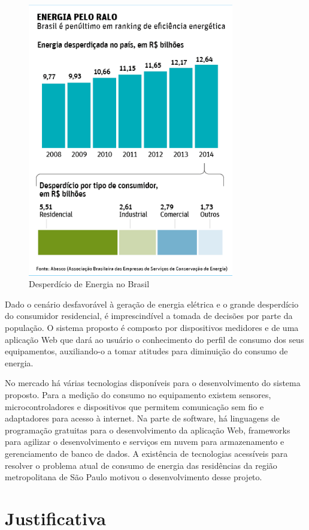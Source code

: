 \begin{figure}[H]
\centering
\includegraphics[width=9cm,keepaspectratio]{figuras/desperdicio.jpg}
\caption{\label{fig:desperdicio} Desperdício de Energia no Brasil}
\end{figure}

Dado o cenário desfavorável à geração de energia elétrica e o grande desperdício do consumidor residencial, é imprescindível a tomada de decisões por parte da população. O sistema proposto é composto por dispositivos medidores e de uma aplicação Web que dará ao usuário o conhecimento do perfil de consumo dos seus equipamentos, auxiliando-o a tomar atitudes para diminuição do consumo de energia.

No mercado há várias tecnologias disponíveis para o desenvolvimento do sistema proposto. Para a medição do consumo no equipamento existem sensores, microcontroladores e dispositivos que permitem comunicação sem fio e adaptadores para acesso à internet. Na parte de software, há linguagens de programação gratuitas para o desenvolvimento da aplicação Web, frameworks para agilizar o desenvolvimento e serviços em nuvem para armazenamento e gerenciamento de banco de dados. A existência de tecnologias acessíveis para resolver o problema atual de consumo de energia das residências da região metropolitana de São Paulo motivou o desenvolvimento desse projeto.

\section{Justificativa}
\label{Sec:justificativa}

